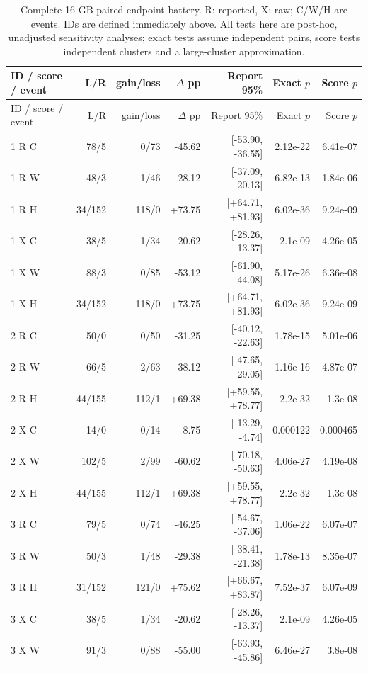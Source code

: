 {\small\setlength{\tabcolsep}{3pt}\begin{longtable}{lrrrrrr}
\caption{Complete 16 GB paired endpoint battery. R: reported, X: raw; C/W/H are events. IDs are defined immediately above. All tests here are post-hoc, unadjusted sensitivity analyses; exact tests assume independent pairs, score tests independent clusters and a large-cluster approximation.}\label{tab:battery-tier16}\\
ID / score / event & L/R & gain/loss & $\Delta$ pp & Report 95\% & Exact $p$ & Score $p$\\\toprule\endfirsthead
ID / score / event & L/R & gain/loss & $\Delta$ pp & Report 95\% & Exact $p$ & Score $p$\\\toprule\endhead
1 R C & 78/5 & 0/73 & -45.62 & [-53.90, -36.55] & 2.12e-22 & 6.41e-07\\
1 R W & 48/3 & 1/46 & -28.12 & [-37.09, -20.13] & 6.82e-13 & 1.84e-06\\
1 R H & 34/152 & 118/0 & +73.75 & [+64.71, +81.93] & 6.02e-36 & 9.24e-09\\
1 X C & 38/5 & 1/34 & -20.62 & [-28.26, -13.37] & 2.1e-09 & 4.26e-05\\
1 X W & 88/3 & 0/85 & -53.12 & [-61.90, -44.08] & 5.17e-26 & 6.36e-08\\
1 X H & 34/152 & 118/0 & +73.75 & [+64.71, +81.93] & 6.02e-36 & 9.24e-09\\
2 R C & 50/0 & 0/50 & -31.25 & [-40.12, -22.63] & 1.78e-15 & 5.01e-06\\
2 R W & 66/5 & 2/63 & -38.12 & [-47.65, -29.05] & 1.16e-16 & 4.87e-07\\
2 R H & 44/155 & 112/1 & +69.38 & [+59.55, +78.77] & 2.2e-32 & 1.3e-08\\
2 X C & 14/0 & 0/14 & -8.75 & [-13.29, -4.74] & 0.000122 & 0.000465\\
2 X W & 102/5 & 2/99 & -60.62 & [-70.18, -50.63] & 4.06e-27 & 4.19e-08\\
2 X H & 44/155 & 112/1 & +69.38 & [+59.55, +78.77] & 2.2e-32 & 1.3e-08\\
3 R C & 79/5 & 0/74 & -46.25 & [-54.67, -37.06] & 1.06e-22 & 6.07e-07\\
3 R W & 50/3 & 1/48 & -29.38 & [-38.41, -21.38] & 1.78e-13 & 8.35e-07\\
3 R H & 31/152 & 121/0 & +75.62 & [+66.67, +83.87] & 7.52e-37 & 6.07e-09\\
3 X C & 38/5 & 1/34 & -20.62 & [-28.26, -13.37] & 2.1e-09 & 4.26e-05\\
3 X W & 91/3 & 0/88 & -55.00 & [-63.93, -45.86] & 6.46e-27 & 3.8e-08\\

\end{longtable}}
